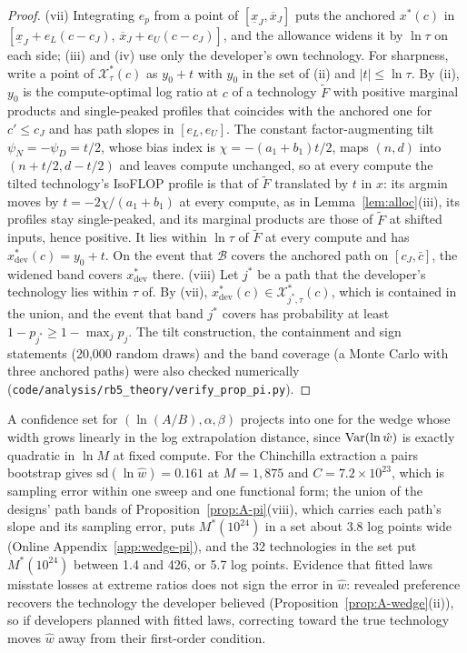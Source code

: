 \begin{proof}
(vii) Integrating $e_p$ from a point of $[\underline x_J,\overline x_J]$ puts the anchored $x^*(c)$ in
$[\underline x_J+e_L(c-c_J),\,\overline x_J+e_U(c-c_J)]$, and the allowance widens it by $\ln\tau$ on each side; (iii)
and (iv) use only the developer's own technology. For sharpness, write a point of $\mathcal X^*_\tau(c)$ as $y_0+t$ with
$y_0$ in the set of (ii) and $|t|\le\ln\tau$. By (ii), $y_0$ is the compute-optimal log ratio at $c$ of a technology
$\tilde F$ with positive marginal products and single-peaked profiles that coincides with the anchored one for $c'\le c_J$
and has path slopes in $[e_L,e_U]$. The constant factor-augmenting tilt $\psi_N=-\psi_D=t/2$, whose bias index is
$\chi=-(a_1+b_1)t/2$, maps $(n,d)$ into $(n+t/2,d-t/2)$ and leaves compute unchanged, so at every compute the tilted
technology's IsoFLOP profile is that of $\tilde F$ translated by $t$ in $x$: its argmin moves by $t=-2\chi/(a_1+b_1)$ at
every compute, as in Lemma~\ref{lem:alloc}(iii), its profiles stay single-peaked, and its marginal products are those of
$\tilde F$ at shifted inputs, hence positive. It lies within $\ln\tau$ of $\tilde F$ at every compute and has
$x^*_{\mathrm{dev}}(c)=y_0+t$. On the event that $\mathcal B$ covers the anchored path on $[c_J,\bar c]$, the widened band
covers $x^*_{\mathrm{dev}}$ there. (viii) Let $j^*$ be a path that the developer's technology lies within $\tau$ of. By
(vii), $x^*_{\mathrm{dev}}(c)\in\mathcal X^*_{j^*,\tau}(c)$, which is contained in the union, and the event that band $j^*$
covers has probability at least $1-p_{j^*}\ge1-\max_jp_j$. The tilt construction, the containment and sign statements
(20,000 random draws) and the band coverage (a Monte Carlo with three anchored paths) were also checked numerically
(\texttt{code/analysis/rb5\_theory/verify\_prop\_pi.py}).
\end{proof}

\begin{remark}\label{rem:A-pi-param}
A confidence set for $(\ln(A/B),\alpha,\beta)$ projects into one for the wedge whose width grows linearly in the log
extrapolation distance, since $\operatorname{Var}(\ln\hat w)$ is exactly quadratic in $\ln M$ at fixed compute. For the Chinchilla
extraction a pairs bootstrap gives $\mathrm{sd}(\ln\hat w)=0.161$ at $M=1{,}875$ and $C=7.2\times10^{23}$, which is sampling
error within one sweep and one functional form; the union of the designs' path bands of
Proposition~\ref{prop:A-pi}(viii), which carries each path's slope and its sampling error, puts $M^*(10^{24})$ in a set
about 3.8 log points wide (Online Appendix~\ref{app:wedge-pi}), and the 32
technologies in the set put $M^*(10^{24})$ between 1.4 and 426, or 5.7 log points. Evidence that
fitted laws misstate losses at extreme ratios \citep{sardana2024beyond} does not sign the error in $\hat w$: revealed
preference recovers the technology the developer believed (Proposition~\ref{prop:A-wedge}(ii)), so if developers planned with
fitted laws, correcting toward the true technology moves $\hat w$ away from their first-order condition.
\end{remark}
